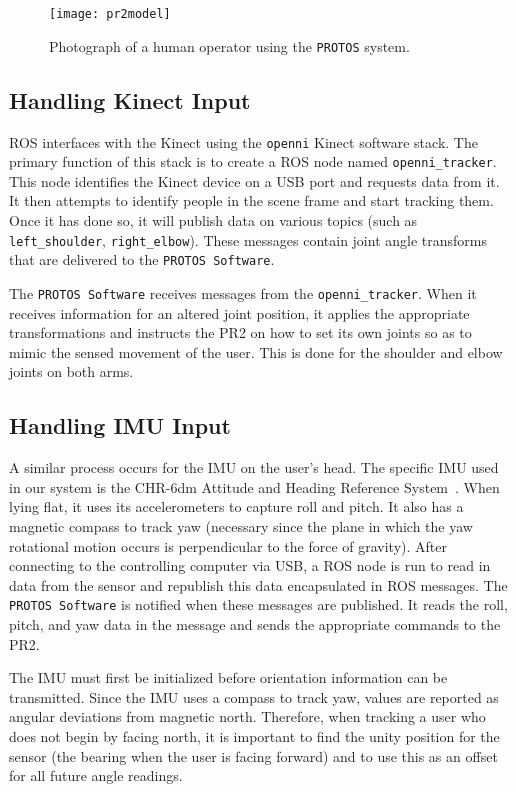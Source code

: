 \documentclass{sig-alternate}
\begin{document}
\begin{figure}[htb] 
	\begin{center}
		\texttt{[image: pr2model]}
	\end{center}
	\caption{Photograph of a human operator using the {\tt PROTOS} system.}
	\label{fig:human_model}
\end{figure}

\subsection{Handling Kinect Input}
\indent ROS interfaces with the Kinect using the {\tt openni} Kinect software stack. The primary
function of this stack is to create a ROS node named {\tt openni\_tracker}. This
node identifies the Kinect device on a USB port and requests data
from it. It then attempts to identify people in the scene frame and start
tracking them. Once it has done so, it will publish data on various
topics (such as {\tt left\_shoulder}, {\tt right\_elbow}). These messages
contain joint angle transforms that are delivered to the {\tt PROTOS Software}.

\indent The {\tt PROTOS Software} receives messages from the
 {\tt openni\_tracker}.
When it receives information for an altered joint position, it applies the
appropriate transformations and instructs the PR2 on how to set its own joints
so as to mimic the sensed movement of the user. This is done for the shoulder
and elbow joints on both arms.

\subsection{Handling IMU Input}
\indent A similar process occurs for the IMU on the user's head. The specific IMU used in our system is
the CHR-6dm Attitude and Heading Reference System~\cite{imu_chr}. When lying flat, it uses its
accelerometers to capture roll and pitch. It also has a magnetic compass to 
track yaw (necessary since the plane in which the yaw rotational motion occurs
is perpendicular to the force of gravity). After connecting to the 
controlling computer via USB, a ROS node is run to read in data from the sensor and republish this data
encapsulated in ROS messages. The {\tt PROTOS Software} is notified when these
messages are published. It reads the roll, pitch, and yaw data in the message
and sends the appropriate commands to the PR2.

\indent The IMU must first be initialized before orientation information can be transmitted. Since the IMU uses a compass
to track yaw, values are reported as angular deviations from magnetic north.
Therefore, when tracking a user who does not begin by facing north, it is 
important to find the unity position for the sensor (the bearing when 
the user is facing forward) and to use this as an offset for all future angle
readings.
\end{document}
